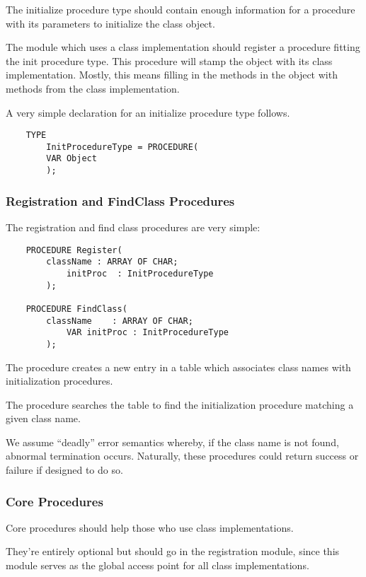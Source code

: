 The initialize procedure type should contain enough information for a procedure
with its parameters to initialize the class object.
 
The module which uses a class implementation should register a procedure
fitting the init procedure type.  This procedure will stamp the object
with its class implementation.  Mostly, this means filling in the methods
in the object with methods from the class implementation.

A very simple declaration for an initialize procedure type follows.
\begin{verbatim}
    TYPE
        InitProcedureType = PROCEDURE(
	    VAR Object
        );
\end{verbatim}

\subsubsection{Registration and FindClass Procedures}

The registration and find class procedures are very simple:
\begin{verbatim}
    PROCEDURE Register(
	    className : ARRAY OF CHAR;
            initProc  : InitProcedureType 
        );

    PROCEDURE FindClass(  
	    className    : ARRAY OF CHAR;
            VAR initProc : InitProcedureType
        );
\end{verbatim}

The  procedure creates a new entry in a table which associates
class names with initialization procedures.

The  procedure searches the table to find the initialization 
procedure matching a given class name.

We assume ``deadly'' error semantics whereby, if the class name is not found,
abnormal termination occurs.  Naturally, these procedures could return
success or failure if designed to do so.

\subsubsection{Core Procedures}

Core procedures should help those who use class implementations.

They're entirely optional but should go in the registration module, since
this module serves as the global access point for all class implementations.

